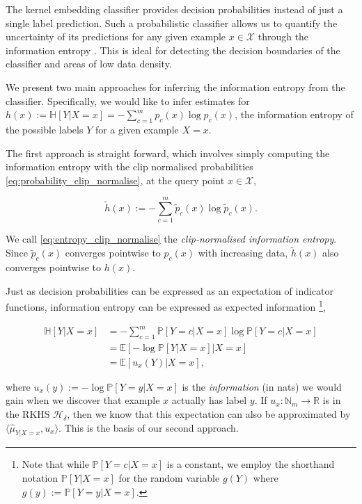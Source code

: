 \documentclass{article}
\begin{document}
	The kernel embedding classifier provides decision probabilities instead of just a single label prediction. Such a probabilistic classifier allows us to quantify the uncertainty of its predictions for any given example $x \in \mathcal{X}$ through the information entropy \citep{shannon1951prediction, jaynes1957information}. This is ideal for detecting the decision boundaries of the classifier and areas of low data density.
	
	We present two main approaches for inferring the information entropy from the classifier. Specifically, we would like to infer estimates for $h(x) := \mathbb{H}[Y | X = x] = - \sum_{c = 1}^{m} p_{c}(x) \log{p_{c}(x)} $, the information entropy of the possible labels $Y$ for a given example $X = x$.
	
	The first approach is straight forward, which involves simply computing the information entropy with the clip normalised probabilities \eqref{eq:probability_clip_normalise}, at the query point $x \in \mathcal{X}$,
	
	\begin{equation}
		\tilde{h}(x) := - \sum_{c = 1}^{m} \tilde{p}_{c}(x) \log{\tilde{p}_{c}(x)}.
	\label{eq:entropy_clip_normalise}
	\end{equation}
	
	We call \eqref{eq:entropy_clip_normalise} the \textit{clip-normalised information entropy}. Since $\tilde{p}_{c}(x)$ converges pointwise to $p_{c}(x)$ with increasing data, $\tilde{h}(x)$ also converges pointwise to $h(x)$.
	
	Just as decision probabilities can be expressed as an expectation of indicator functions, information entropy can be expressed as expected information \footnote{Note that while $\mathbb{P}[Y = c | X = x]$ is a constant, we employ the shorthand notation $\mathbb{P}[Y| X = x]$ for the random variable $g(Y)$ where $g(y) := \mathbb{P}[Y = y | X = x]$.},
	
	\begin{equation}
	\begin{aligned}
		\mathbb{H}[Y | X = x] &= - \sum_{c = 1}^{m} \mathbb{P}[Y = c| X = x] \log{\mathbb{P}[Y = c | X = x]} \\
		&= \mathbb{E}[- \log{\mathbb{P}[Y | X = x]} | X = x] \\
		&= \mathbb{E}[u_{x}(Y) | X = x],
	\end{aligned}
	\end{equation}
	
	where $u_{x}(y) := - \log{\mathbb{P}[Y = y | X = x]}$ is the \textit{information} (in nats) we would gain when we discover that example $x$ actually has label $y$. If $u_{x} : \mathbb{N}_{m} \to \mathbb{R}$ is in the RKHS $\mathcal{H}_{\delta}$, then we know that this expectation can also be approximated by $\langle \hat{\mu}_{Y | X = x}, u_{x} \rangle$. This is the basis of our second approach.
	
\end{document}
